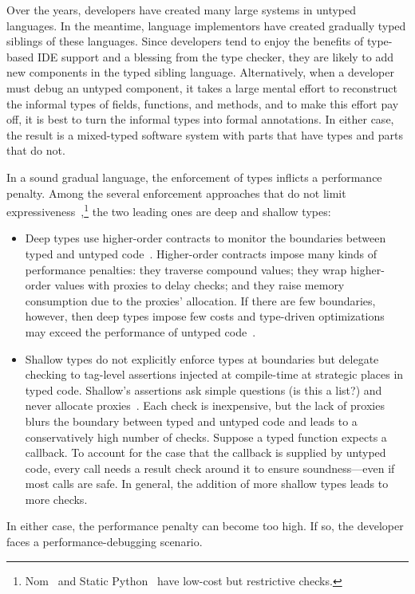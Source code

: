 
Over the years, developers have created many large systems in untyped languages.
In the meantime, language implementors have created gradually typed siblings of
these languages.  Since developers tend to enjoy the benefits of type-based IDE
support and a blessing from the type checker, they are likely to add new
components in the typed sibling language. Alternatively, when a developer must
debug an untyped component, it takes a large mental effort
to reconstruct the informal types of fields, functions, and methods, and to make
this effort pay off, it is best to turn the informal types into formal
annotations. In either case, the result is a mixed-typed software system
with parts that have types and parts that do not.

In a sound gradual language, the enforcement of types inflicts a performance penalty.
Among the several enforcement approaches that do not limit
 expressiveness~\cite{type-untyped},\footnote{Nom~\cite{mt-oopsla-2017} and Static
Python~\cite{lgmvpk-pj-2023} have low-cost but restrictive
checks.} the two leading ones are deep and shallow types:
\begin{itemize}
  \item
    Deep types use higher-order contracts to monitor the
    boundaries between typed and untyped
    code~\cite{ff-icfp-2002,tf-dls-2006,st-sfp-2006}.  Higher-order
    contracts impose many kinds of performance penalties: they traverse
    compound values; they wrap higher-order values with proxies to delay
    checks; and they raise memory consumption due to the proxies'
    allocation.  If there are few boundaries, however, then deep types
    impose few costs and type-driven optimizations may exceed the
    performance of untyped code~\cite{gtnffvf-jfp-2019}.

  \item
    Shallow types do not explicitly enforce types at boundaries but
    delegate checking to tag-level assertions injected at
    compile-time at strategic places in typed code. Shallow's assertions
    ask simple questions (is this a list?) and never allocate
    proxies~\cite{vss-popl-2017, vksb-dls-2014}.  Each check is
    inexpensive, but the lack of proxies blurs the boundary between typed and
    untyped code and leads to a conservatively high number of checks.
    Suppose a typed function expects a callback.  To account for the case
    that the callback is supplied by untyped code, every call needs a
    result check around it to ensure soundness---even if most calls are
    safe.  In general, the addition of more shallow types leads to more
    checks.

\end{itemize}
In either case, the performance penalty can become too high.
If so, the developer faces a performance-debugging scenario.

